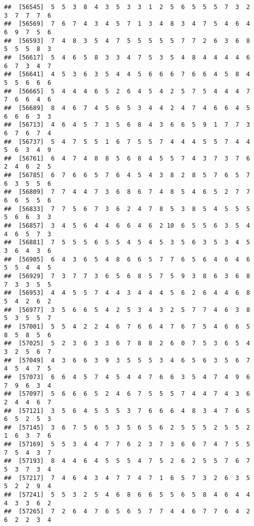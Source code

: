 \documentclass[
]{book}
\begin{document}
\begin{verbatim}
##  [56545]  5  5  3  8  4  3  5  3  3  1  2  5  6  5  5  5  7  3  2  3  7  7  7  6
##  [56569]  7  6  7  4  3  4  5  7  1  3  4  8  3  4  7  5  4  6  4  6  9  7  5  6
##  [56593]  7  4  8  3  5  4  7  5  5  5  5  5  7  7  2  6  3  6  8  5  5  5  8  3
##  [56617]  5  4  6  5  8  3  3  4  7  5  3  5  4  8  4  4  4  4  6  6  7  3  4  7
##  [56641]  4  5  3  6  3  5  4  4  5  6  6  6  7  6  6  4  5  8  4  5  5  6  6  6
##  [56665]  5  4  4  4  6  5  2  6  4  5  4  2  5  7  5  4  4  4  7  7  6  6  4  6
##  [56689]  8  4  6  7  4  5  6  5  3  4  4  2  4  7  4  6  6  4  5  6  6  6  3  3
##  [56713]  4  6  4  5  7  3  5  6  8  4  3  6  6  5  9  1  7  7  3  6  7  6  7  4
##  [56737]  5  4  7  5  5  1  6  7  5  5  7  4  4  4  5  5  7  4  4  5  6  3  4  9
##  [56761]  6  4  7  4  8  8  5  6  8  4  5  5  7  4  3  7  3  7  6  2  4  6  2  5
##  [56785]  6  7  6  6  5  7  6  4  5  4  3  8  2  8  5  7  6  5  7  6  3  5  5  6
##  [56809]  7  7  4  4  7  3  6  8  6  7  4  8  5  4  6  5  2  7  7  6  6  5  5  6
##  [56833]  7  7  5  6  7  3  6  2  4  7  8  5  3  8  5  4  5  5  5  5  6  6  3  3
##  [56857]  3  4  5  6  4  4  6  6  4  6  2 10  6  5  5  6  3  5  4  4  6  5  7  3
##  [56881]  7  5  5  5  6  5  5  4  5  4  5  3  5  6  3  5  3  4  5  3  6  4  3  6
##  [56905]  6  4  3  6  5  4  8  6  6  5  7  7  6  5  6  4  6  4  6  5  5  4  4  5
##  [56929]  7  3  7  7  3  6  5  6  8  5  7  5  9  3  8  6  3  6  8  7  3  3  5  5
##  [56953]  4  4  5  5  7  4  4  3  4  4  4  5  6  2  6  4  4  6  8  5  4  2  6  2
##  [56977]  3  5  6  6  5  4  2  5  3  4  3  2  5  7  7  4  6  3  8  5  3  5  5  7
##  [57001]  5  5  4  2  2  4  6  7  6  6  4  7  6  7  5  4  6  6  5  8  5  8  5  6
##  [57025]  5  2  3  6  3  3  6  7  8  8  2  6  0  7  5  3  6  5  4  3  2  5  6  7
##  [57049]  4  3  6  6  3  9  3  5  5  5  3  4  6  5  6  3  5  6  7  4  5  4  7  5
##  [57073]  6  6  4  5  7  4  5  4  4  7  6  6  3  5  4  7  4  9  6  7  9  6  3  4
##  [57097]  5  6  6  6  5  2  4  6  7  5  5  5  7  4  4  7  4  3  6  2  4  4  6  7
##  [57121]  3  5  6  4  5  5  5  3  7  6  6  6  4  8  3  4  7  6  5  6  5  2  5  3
##  [57145]  3  6  7  5  6  5  3  5  6  5  6  2  5  5  5  2  5  5  2  1  6  3  7  6
##  [57169]  5  5  3  4  4  7  7  6  2  3  7  3  6  6  7  4  7  5  5  7  5  4  3  7
##  [57193]  8  4  4  6  4  5  5  5  4  7  5  2  6  2  5  5  7  6  7  5  3  7  3  4
##  [57217]  7  4  6  4  3  4  7  7  4  7  1  6  5  7  3  2  6  3  5  5  2  2  9  4
##  [57241]  5  5  3  2  5  4  6  8  6  6  5  5  6  5  8  4  6  4  4  4  3  3  6  2
##  [57265]  7  2  6  4  7  6  5  6  5  7  7  4  4  6  7  7  6  4  2  6  2  2  3  4

\end{verbatim}
\end{document}
